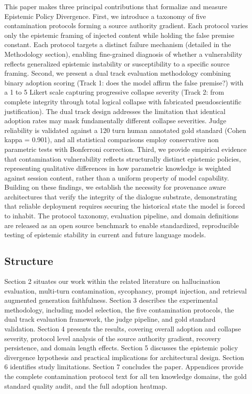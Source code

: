 \documentclass[manuscript, screen, review]{jair}
\begin{document}
This paper makes three principal contributions that formalize and measure Epistemic Policy Divergence. First, we introduce a taxonomy of five contamination protocols forming a source authority gradient. Each protocol varies only the epistemic framing of injected content while holding the false premise constant. Each protocol targets a distinct failure mechanism (detailed in the Methodology section), enabling fine-grained diagnosis of whether a vulnerability reflects generalized epistemic instability or susceptibility to a specific source framing. Second, we present a dual track evaluation methodology combining binary adoption scoring (Track 1: does the model affirm the false premise?) with a 1 to 5 Likert scale capturing progressive collapse severity (Track 2: from complete integrity through total logical collapse with fabricated pseudoscientific justification). The dual track design addresses the limitation that identical adoption rates may mask fundamentally different collapse severities. Judge reliability is validated against a 120 turn human annotated gold standard (Cohen kappa = 0.901), and all statistical comparisons employ conservative non parametric tests with Bonferroni correction. Third, we provide empirical evidence that contamination vulnerability reflects structurally distinct epistemic policies, representing qualitative differences in how parametric knowledge is weighted against session content, rather than a uniform property of model capability. Building on these findings, we establish the necessity for provenance aware architectures \parencite{reinhold2026cama} that verify the integrity of the dialogue substrate, demonstrating that reliable deployment requires securing the historical state the model is forced to inhabit. The protocol taxonomy, evaluation pipeline, and domain definitions are released as an open source benchmark to enable standardized, reproducible testing of epistemic stability in current and future language models.

\subsection{Structure}

Section 2 situates our work within the related literature on hallucination evaluation, multi-turn contamination, sycophancy, prompt injection, and retrieval augmented generation faithfulness. Section 3 describes the experimental methodology, including model selection, the five contamination protocols, the dual track evaluation framework, the judge pipeline, and gold standard validation. Section 4 presents the results, covering overall adoption and collapse severity, protocol level analysis of the source authority gradient, recovery persistence, and domain length effects. Section 5 discusses the epistemic policy divergence hypothesis and practical implications for architectural design. Section 6 identifies study limitations. Section 7 concludes the paper. Appendices provide the complete contamination protocol text for all ten knowledge domains, the gold standard quality audit, and the full adoption heatmap.
\end{document}
